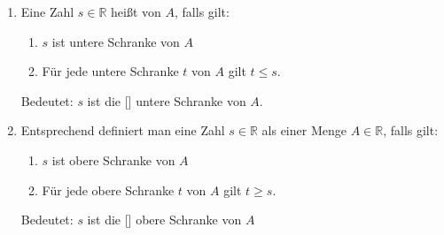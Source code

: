 \begin{enumerate}[label=(\alph*)]
    \item Eine Zahl $s \in \mathbb{R}$ heißt  von $A$, falls gilt:
        \begin{enumerate}[label=\arabic*.]
            \item $s$ ist untere Schranke von $A$
            \item Für jede untere Schranke $t$ von $A$ gilt $t \leq s$.
        \end{enumerate}
        Bedeutet: $s$ ist die [] untere Schranke von $A$.
    \item Entsprechend definiert man eine Zahl $s \in \mathbb{R}$ als  einer Menge $A \in \mathbb{R}$, falls gilt:
        \begin{enumerate}[label=\arabic*.]
            \item $s$ ist obere Schranke von $A$
            \item Für jede obere Schranke $t$ von $A$ gilt $t \geq s$.
        \end{enumerate}
        Bedeutet: $s$ ist die [] obere Schranke von $A$
\end{enumerate}